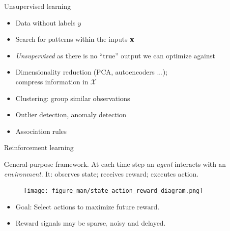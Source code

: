 \documentclass[11pt,compress,t,notes=noshow, xcolor=table]{beamer}
\begin{document}
\begin{vbframe}{Unsupervised learning}
  \begin{itemize}
    \item Data without labels $y$
    \item Search for patterns within the inputs $\mathbf{x}$
    \item \textit{Unsupervised} as there is no ``true'' output
    we can optimize against
  \end{itemize}
  
  \vfill
  
  {
  \begin{itemize}
    \item Dimensionality reduction (PCA, autoencoders ...);\\ 
    compress information in $\mathcal X$
    \item Clustering: group similar observations
    \item Outlier detection, anomaly detection
    \item Association rules
  \end{itemize}
  }
\end{vbframe}

\begin{vbframe}{Reinforcement learning}
  
  General-purpose framework.
  At each time step an \emph{agent} interacts with an \emph{environment}. 
  It: observes state; receives reward; executes action.
  
  \begin{figure}
    \texttt{[image: figure\_man/state\_action\_reward\_diagram.png]}
  \end{figure}
  
  
  \begin{itemize}
    \item Goal: Select actions to maximize future reward.
    \item Reward signals may be sparse, noisy and delayed.
  \end{itemize}
  
\end{vbframe}


\end{document}
